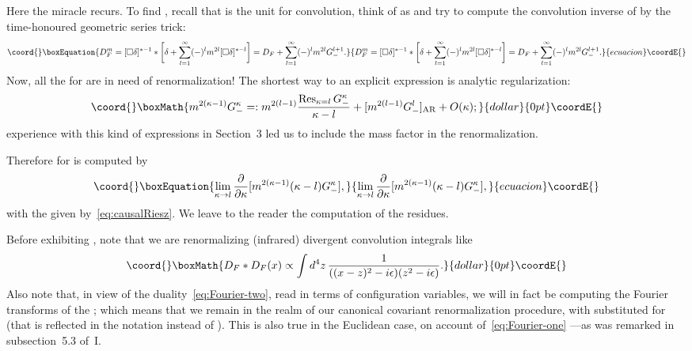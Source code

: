 \documentclass[a4paper,12pt]{article}
\providecommand{\del}{\partial}        %
\providecommand{\dl}{\delta}           %
\providecommand{\eps}{\epsilon}        %
\DeclareMathOperator*{\Res}{Res}   %
\providecommand{\7}{\dagger}           %
\theoremstyle{plain}
\theoremstyle{definition}
\begin{document}
Here the miracle recurs. To find \coordHE{}, recall that \myHighlight{$\dl$}\coordHE{} is the
unit for convolution, think of \coordHE{} as \myHighlight{$[\square\dl]^{*-1}$}\coordHE{} and try
to compute the convolution inverse of
\myHighlight{$[(\square + m^2)\dl]^{*-1} =
[\square\dl]^{*-1} * [\dl + m^2[\square\dl]^{*-1}]^{*-1}$}\coordHE{}
by the time-honoured geometric series trick:
\begin{equation}\coord{}\boxEquation{
D^m_F = [\square\dl]^{*-1} *
\biggl[\dl + \sum_{l=1}^\infty (-)^l m^{2l}[\square\dl]^{*-l}\biggr]
= D_F + \sum_{l=1}^\infty (-)^l m^{2l} G^{l+1}_-.
\label{eq:themouse}
}{
D^m_F = [\square\dl]^{*-1} *
\biggl[\dl + \sum_{l=1}^\infty (-)^l m^{2l}[\square\dl]^{*-l}\biggr]
= D_F + \sum_{l=1}^\infty (-)^l m^{2l} G^{l+1}_-.
}{ecuacion}\coordE{}\end{equation}
Now, all the \coordHE{} for \coordHE{} are in need of renormalization! The
shortest way to an explicit expression is analytic regularization:
$$\coord{}\boxMath{
m^{2(\kappa-1)}G^{\kappa}_- =:
m^{2(l-1)} \frac{\Res_{\kappa=l} G_-^{\kappa}}{\kappa-l}
+ [m^{2(l-1)}G^{l}_-]_{\rm AR} + O(\kappa);
}{dollar}{0pt}\coordE{}$$
experience with this kind of expressions in Section~3 led us to include
the mass factor in the renormalization.

Therefore \coordHE{} for \coordHE{} is computed by
\begin{equation}\coord{}\boxEquation{
\lim_{\kappa\to l}
\frac{\del}{\del\kappa}[m^{2(\kappa-1)}(\kappa-l)G^{\kappa}_-],
\label{eq:thetrap}
}{
\lim_{\kappa\to l}
\frac{\del}{\del\kappa}[m^{2(\kappa-1)}(\kappa-l)G^{\kappa}_-],
}{ecuacion}\coordE{}\end{equation}
with the \coordHE{} given by~\eqref{eq:causalRiesz}. We leave
to the reader the computation of the residues.

Before exhibiting \coordHE{}, note that we are
renormalizing (infrared) divergent convolution integrals like
$$\coord{}\boxMath{
D_F * D_F(x) \propto \int d^4z\, \frac{1}{((x-z)^2-i\eps)(z^2-i\eps)}.
}{dollar}{0pt}\coordE{}$$
Also note that, in view of the duality~\eqref{eq:Fourier-two}, read in
terms of configuration variables, we will in fact be computing the
Fourier transforms of the \myHighlight{$(x^2-i\eps)^l$}\coordHE{}; which means that we remain
in the realm of our canonical covariant renormalization procedure,
with \coordHE{} substituted for \myHighlight{$\mu$}\coordHE{} (that is reflected in the notation
\coordHE{} instead of \coordHE{}). This is also true in
the Euclidean case, on account of~\eqref{eq:Fourier-one} ---as was
remarked in subsection~5.3 of~I.
\end{document}
